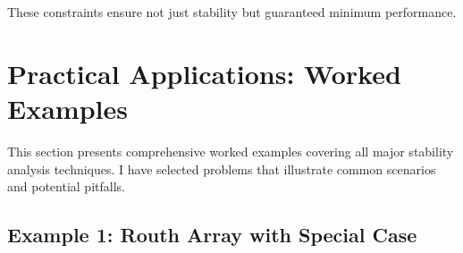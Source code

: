 These constraints ensure not just stability but guaranteed minimum performance.

\section{Practical Applications: Worked Examples}
\label{sec:stability_examples}

This section presents comprehensive worked examples covering all major stability analysis techniques. I have selected problems that illustrate common scenarios and potential pitfalls.

\subsection{Example 1: Routh Array with Special Case}

